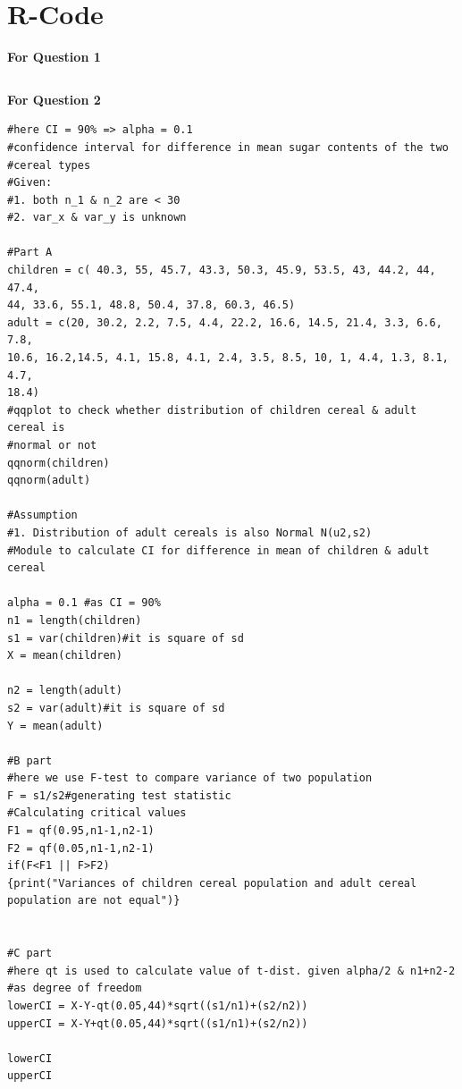 \documentclass[12pt,a4paper]{report}
\begin{document}
\section{R-Code}
\textbf{For Question 1}\\
\begin{lstlisting}

\end{lstlisting}
\textbf{For Question 2}\\
\begin{lstlisting}
#here CI = 90% => alpha = 0.1
#confidence interval for difference in mean sugar contents of the two
#cereal types
#Given: 
#1. both n_1 & n_2 are < 30
#2. var_x & var_y is unknown

#Part A
children = c( 40.3, 55, 45.7, 43.3, 50.3, 45.9, 53.5, 43, 44.2, 44, 47.4, 
44, 33.6, 55.1, 48.8, 50.4, 37.8, 60.3, 46.5)
adult = c(20, 30.2, 2.2, 7.5, 4.4, 22.2, 16.6, 14.5, 21.4, 3.3, 6.6, 7.8, 
10.6, 16.2,14.5, 4.1, 15.8, 4.1, 2.4, 3.5, 8.5, 10, 1, 4.4, 1.3, 8.1, 4.7, 
18.4)
#qqplot to check whether distribution of children cereal & adult cereal is 
#normal or not
qqnorm(children)
qqnorm(adult)

#Assumption
#1. Distribution of adult cereals is also Normal N(u2,s2)
#Module to calculate CI for difference in mean of children & adult cereal

alpha = 0.1 #as CI = 90%
n1 = length(children)
s1 = var(children)#it is square of sd
X = mean(children)

n2 = length(adult)
s2 = var(adult)#it is square of sd
Y = mean(adult)

#B part
#here we use F-test to compare variance of two population
F = s1/s2#generating test statistic
#Calculating critical values
F1 = qf(0.95,n1-1,n2-1)
F2 = qf(0.05,n1-1,n2-1)
if(F<F1 || F>F2)
{print("Variances of children cereal population and adult cereal 
population are not equal")}


#C part
#here qt is used to calculate value of t-dist. given alpha/2 & n1+n2-2 
#as degree of freedom
lowerCI = X-Y-qt(0.05,44)*sqrt((s1/n1)+(s2/n2))
upperCI = X-Y+qt(0.05,44)*sqrt((s1/n1)+(s2/n2))

lowerCI
upperCI
\end{lstlisting}
\end{document}
